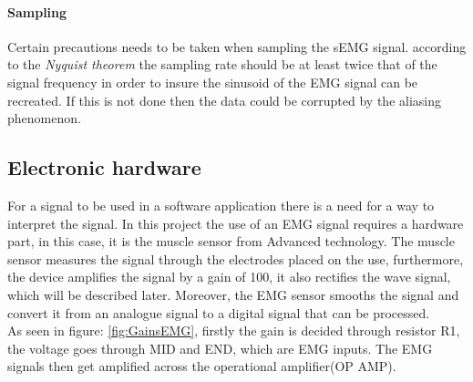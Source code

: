 \paragraph{Sampling}
Certain precautions needs to be taken when sampling the sEMG signal. according to the \textit{Nyquist theorem} the sampling rate should be at least twice that of the signal frequency in order to insure the sinusoid of the EMG signal can be recreated. If this is not done then the data could be corrupted by the aliasing phenomenon. \cite{Nyquist}




\subsection*{Electronic hardware}
For a signal to be used in a software application there is a need for a way to interpret the signal. In this project the use of an EMG signal requires a hardware part, in this case, it is the muscle sensor from Advanced technology. The muscle sensor measures the signal through the electrodes placed on the use, furthermore, the device amplifies the signal by a gain of 100, it also rectifies the wave signal, which will be described later. Moreover, the EMG sensor smooths the signal and convert it from an analogue signal to a digital signal that can be processed\cite{EMGHARD}.\\
As seen in figure: \ref{fig:GainsEMG}, firstly the gain is decided through resistor R1, the voltage goes through MID and END, which are EMG inputs. The EMG signals then get amplified across the operational amplifier(OP AMP).\\

